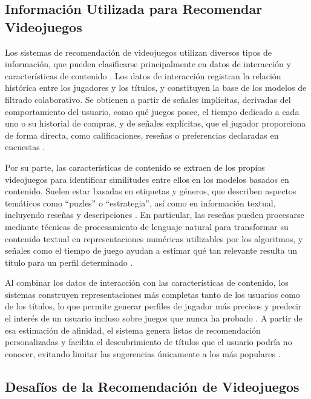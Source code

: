 \subsection{Información Utilizada para Recomendar Videojuegos}\label{subsec:informacion_recomendacion}

Los sistemas de recomendación de videojuegos utilizan diversos tipos de información, que pueden clasificarse principalmente en datos de interacción y características de contenido \parencite{ViljanenEtAl2020, CheuqueEtAl2019}. Los datos de interacción registran la relación histórica entre los jugadores y los títulos, y constituyen la base de los modelos de filtrado colaborativo. Se obtienen a partir de señales implícitas, derivadas del comportamiento del usuario, como qué juegos posee, el tiempo dedicado a cada uno o su historial de compras, y de señales explícitas, que el jugador proporciona de forma directa, como calificaciones, reseñas o preferencias declaradas en encuestas \parencite{CheuqueEtAl2019, ViljanenEtAl2020}.

Por su parte, las características de contenido se extraen de los propios videojuegos para identificar similitudes entre ellos en los modelos basados en contenido. Suelen estar basadas en etiquetas y géneros, que describen aspectos temáticos como \enquote{puzles} o \enquote{estrategia}, así como en información textual, incluyendo reseñas y descripciones \parencite{LeeJung2019, ViljanenEtAl2020}. En particular, las reseñas pueden procesarse mediante técnicas de procesamiento de lenguaje natural para transformar su contenido textual en representaciones numéricas utilizables por los algoritmos, y señales como el tiempo de juego ayudan a estimar qué tan relevante resulta un título para un perfil determinado \parencite{CheuqueEtAl2019}.

Al combinar los datos de interacción con las características de contenido, los sistemas construyen representaciones más completas tanto de los usuarios como de los títulos, lo que permite generar perfiles de jugador más precisos y predecir el interés de un usuario incluso sobre juegos que nunca ha probado \parencite{DeSimoneEtAl2021, ViljanenEtAl2020}. A partir de esa estimación de afinidad, el sistema genera listas de recomendación personalizadas y facilita el descubrimiento de títulos que el usuario podría no conocer, evitando limitar las sugerencias únicamente a los más populares \parencite{CheuqueEtAl2019}.

\subsection{Desafíos de la Recomendación de Videojuegos}\label{subsec:desafios_recomendacion}


